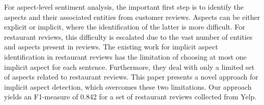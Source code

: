 For aspect-level sentiment analysis, the important first step is to identify the aspects and their associated entities from customer reviews. Aspects can be either explicit or implicit, where the identification of the latter is more difficult. For restaurant reviews, this difficulty is escalated due to the vast number of entities and aspects present in reviews. The existing work for implicit aspect identification in restaurant reviews has the limitation of choosing at most one implicit aspect for each sentence. Furthermore, they deal with only a limited set of aspects related to restaurant reviews. This paper presents a novel approach for implicit aspect detection, which overcomes these two limitations. Our approach yields an F1-measure of 0.842 for a set of restaurant reviews collected from Yelp.
